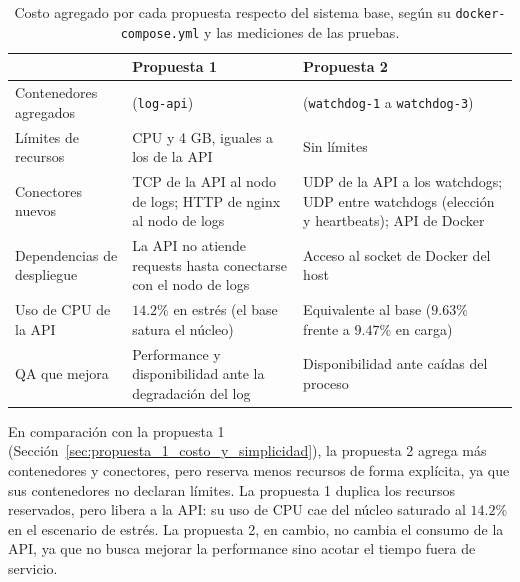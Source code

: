         \begin{table}[H]
            \centering
            \small
            \setlength{\tabcolsep}{4pt}
            \renewcommand{\arraystretch}{1.2}
            \caption{Costo agregado por cada propuesta respecto del sistema base, según su \texttt{docker-compose.yml} y las mediciones de las pruebas.}
            \label{tab:propuesta_2_comparacion_costo}
            \begin{tabular}{@{}>{\raggedright\arraybackslash}p{}>{\raggedright\arraybackslash}p{}>{\raggedright\arraybackslash}p{}@{}}
                \toprule
                & \textbf{Propuesta 1} & \textbf{Propuesta 2} \\
                \midrule
                Contenedores agregados & 1 (\texttt{log-api}) & 3 (\texttt{watchdog-1} a \texttt{watchdog-3}) \\
                \midrule
                Límites de recursos & 1 CPU y 4 GB, iguales a los de la API & Sin límites \\
                \midrule
                Conectores nuevos & TCP de la API al nodo de logs; HTTP de nginx al nodo de logs & UDP de la API a los watchdogs; UDP entre watchdogs (elección y heartbeats); API de Docker \\
                \midrule
                Dependencias de despliegue & La API no atiende requests hasta conectarse con el nodo de logs & Acceso al socket de Docker del host \\
                \midrule
                Uso de CPU de la API & $14.2\%$ en estrés (el base satura el núcleo) & Equivalente al base ($9.63\%$ frente a $9.47\%$ en carga) \\
                \midrule
                QA que mejora & Performance y disponibilidad ante la degradación del log & Disponibilidad ante caídas del proceso \\
                \bottomrule
            \end{tabular}
        \end{table}

        En comparación con la propuesta 1 (Sección~\ref{sec:propuesta_1_costo_y_simplicidad}), la propuesta 2 agrega más
        contenedores y conectores, pero reserva menos recursos de forma explícita, ya que sus contenedores no declaran límites. La
        propuesta 1 duplica los recursos reservados, pero libera a la API: su uso de CPU cae del núcleo saturado al $14.2\%$ en el
        escenario de estrés. La propuesta 2, en cambio, no cambia el consumo de la API, ya que no busca mejorar la performance sino
        acotar el tiempo fuera de servicio.

